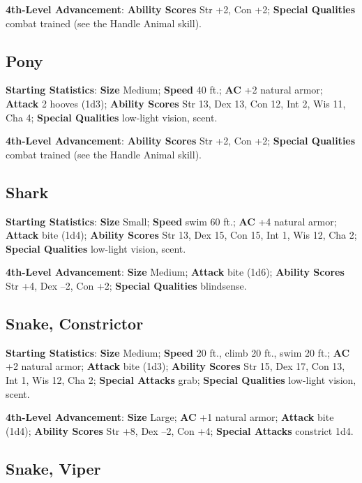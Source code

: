 \textbf{4th-Level Advancement}: \textbf{Ability Scores }Str +2, Con +2; \textbf{Special Qualities }combat trained (see the Handle Animal skill). 
				
\subsection{Pony}

				
\textbf{Starting Statistics}:\textbf{ Size} Medium; \textbf{Speed} 40 ft.; \textbf{AC} +2 natural armor; \textbf{Attack} 2 hooves (1d3); \textbf{Ability Scores }Str 13, Dex 13, Con 12, Int 2, Wis 11, Cha 4; \textbf{Special Qualities} low-light vision, scent.
				
\textbf{4th-Level Advancement}: \textbf{Ability Scores }Str +2, Con +2; \textbf{Special Qualities }combat trained (see the Handle Animal skill). 
				
\subsection{Shark}

				
\textbf{Starting Statistics}:\textbf{ Size} Small; \textbf{Speed} swim 60 ft.; \textbf{AC} +4 natural armor; \textbf{Attack} bite (1d4); \textbf{Ability Scores }Str 13, Dex 15, Con 15, Int 1, Wis 12, Cha 2; \textbf{Special Qualities} low-light vision, scent.
				
\textbf{4th-Level Advancement}: \textbf{Size }Medium; \textbf{Attack} bite (1d6); \textbf{Ability Scores }Str +4, Dex --2, Con +2; \textbf{Special Qualities} blindsense. 
				
\subsection{Snake, Constrictor}

				
\textbf{Starting Statistics}:\textbf{ Size} Medium; \textbf{Speed} 20 ft., climb 20 ft., swim 20 ft.; \textbf{AC} +2 natural armor; \textbf{Attack} bite (1d3); \textbf{Ability Scores }Str 15, Dex 17, Con 13, Int 1, Wis 12, Cha 2; \textbf{Special Attacks }grab; \textbf{Special Qualities} low-light vision, scent.
				
\textbf{4th-Level Advancement}: \textbf{Size }Large; \textbf{AC} +1 natural armor; \textbf{Attack} bite (1d4); \textbf{Ability Scores }Str +8, Dex --2, Con +4; \textbf{Special Attacks} constrict 1d4. 
				
\subsection{Snake, Viper}

